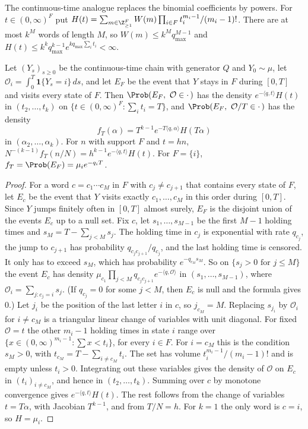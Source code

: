 The continuous-time analogue replaces the binomial coefficients by powers. For
$t\in(0,\infty)^F$ put
$H(t)=\sum_{m\in\Z_{\ge1}^F}W(m)\prod_{i\in F}t_i^{m_i-1}/(m_i-1)!$. There are at most $k^M$
words of length $M$, so $W(m)\le k^Mq_{\max}^{M-1}$ and
$H(t)\le k^kq_{\max}^{k-1}e^{kq_{\max}\sum_it_i}<\infty$.

\begin{lemma}\label{lem:continuum}
Let $(Y_s)_{s\ge0}$ be the continuous-time chain with generator $Q$ and $Y_0\sim\mu$, let
$\mathcal O_i=\int_0^T\mathbf 1\{Y_s=i\}\,ds$, and let $E_F$ be the event that $Y$ stays in $F$
during $[0,T]$ and visits every state of $F$. Then $\Prob(E_F,\ \mathcal O\in\cdot\,)$ has the
density $e^{-\langle q,t\rangle}H(t)$ in $(t_2,\dots,t_k)$ on $\{t\in(0,\infty)^F:\sum_it_i=T\}$,
and $\Prob(E_F,\ \mathcal O/T\in\cdot\,)$ has the density
\[
f_T(\alpha)=T^{k-1}e^{-T\langle q,\alpha\rangle}H(T\alpha)
\]
in $(\alpha_2,\dots,\alpha_k)$. For $n$ with support $F$ and $t=hn$,
$N^{-(k-1)}f_T(n/N)=h^{k-1}e^{-\langle q,t\rangle}H(t)$. For $F=\{i\}$,
$f_T=\Prob(E_F)=\mu_ie^{-q_iT}$.
\end{lemma}

\begin{proof}
For a word $c=c_1\cdots c_M$ in $F$ with $c_j\ne c_{j+1}$ that contains every state of $F$, let
$E_c$ be the event that $Y$ visits exactly $c_1,\dots,c_M$ in this order during $[0,T]$. Since $Y$
jumps finitely often in $[0,T]$ almost surely, $E_F$ is the disjoint union of the events $E_c$ up
to a null set. Fix $c$, let $s_1,\dots,s_{M-1}$ be the first $M-1$ holding times and
$s_M=T-\sum_{j<M}s_j$. The holding time in $c_j$ is exponential with rate $q_{c_j}$, the jump to
$c_{j+1}$ has probability $q_{c_jc_{j+1}}/q_{c_j}$, and the last holding time is censored. It
only has to exceed $s_M$, which has probability $e^{-q_{c_M}s_M}$. So on
$\{s_j>0\text{ for }j\le M\}$ the event $E_c$ has density
$\mu_{c_1}\prod_{j<M}q_{c_jc_{j+1}}e^{-\langle q,\mathcal O\rangle}$ in $(s_1,\dots,s_{M-1})$,
where $\mathcal O_i=\sum_{j:c_j=i}s_j$. (If $q_{c_j}=0$ for some $j<M$, then $E_c$ is null and the formula gives $0$.) Let
$j_i$ be the position of the last letter $i$ in $c$, so $j_{c_M}=M$. Replacing $s_{j_i}$ by
$\mathcal O_i$ for $i\ne c_M$ is a triangular linear change of variables with unit diagonal. For
fixed $\mathcal O=t$ the other $m_i-1$ holding times in state $i$ range over
$\{x\in(0,\infty)^{m_i-1}:\sum x<t_i\}$, for every $i\in F$. For $i=c_M$ this is the condition
$s_M>0$, with $t_{c_M}=T-\sum_{i\ne c_M}t_i$. The set has volume $t_i^{m_i-1}/(m_i-1)!$ and is
empty unless $t_i>0$. Integrating out these variables gives the density of $\mathcal O$ on $E_c$
in $(t_i)_{i\ne c_M}$, and hence in $(t_2,\dots,t_k)$. Summing over $c$ by monotone convergence
gives $e^{-\langle q,t\rangle}H(t)$. The rest follows from the change of variables $t=T\alpha$, with Jacobian
$T^{k-1}$, and from $T/N=h$. For $k=1$ the only word is $c=i$, so $H=\mu_i$.
\end{proof}

